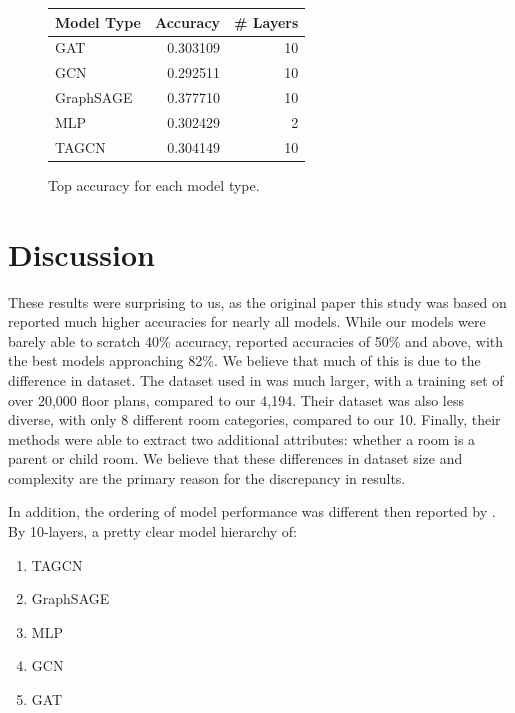 \documentclass{article}
\begin{document}
\begin{figure}
    \centering
    \begin{tabular}{lrr}
        \toprule
        Model Type & Accuracy & \# Layers \\
        \midrule
        GAT        & 0.303109 & 10        \\
        GCN        & 0.292511 & 10        \\
        GraphSAGE  & 0.377710 & 10        \\
        MLP        & 0.302429 & 2         \\
        TAGCN      & 0.304149 & 10        \\
        \bottomrule
    \end{tabular}
    \caption{Top accuracy for each model type.}
    \label{tab:results}
\end{figure}


\section{Discussion}

These results were surprising to us, as the original paper this study was based on reported much higher accuracies for nearly all models. While our models were barely able to scratch 40\% accuracy, \citet{floorgraphs2021} reported accuracies of 50\% and above, with the best models approaching 82\%. We believe that much of this is due to the difference in dataset. The dataset used in \citet{floorgraphs2021} was much larger, with a training set of over 20,000 floor plans, compared to our 4,194. Their dataset was also less diverse, with only 8 different room categories, compared to our 10. Finally, their methods were able to extract two additional attributes: whether a room is a parent or child room. We believe that these differences in dataset size and complexity are the primary reason for the discrepancy in results.

In addition, the ordering of model performance was different then reported by \citet{floorgraphs2021}. By 10-layers, a pretty clear model hierarchy of:

\begin{enumerate}
    \item TAGCN
    \item GraphSAGE
    \item MLP
    \item GCN
    \item GAT
\end{enumerate}
\end{document}
